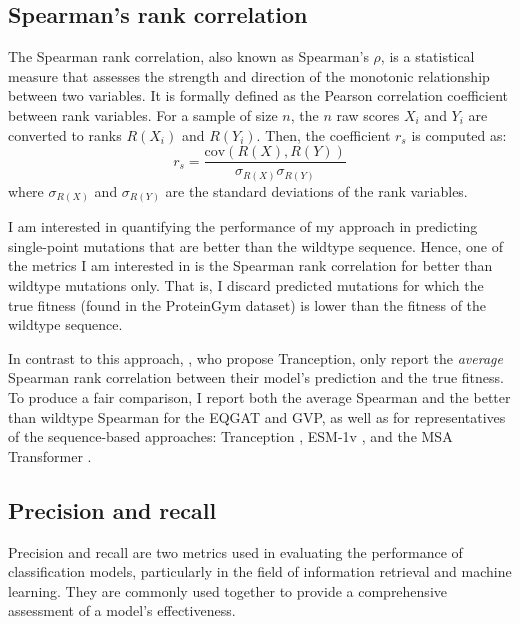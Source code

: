 \subsection{Spearman's rank correlation} 
The Spearman rank correlation, also known as Spearman's $\rho$, is a statistical measure that assesses the strength and direction of the monotonic relationship between two variables. It is formally defined as the Pearson correlation coefficient between rank variables. For a sample of size $n$, the $n$ raw scores $X_i$ and $Y_i$ are converted to ranks $R(X_i)$ and $R(Y_i)$. Then, the coefficient $r_s$ is computed as:
\begin{equation}
    r_s = \frac{\text{cov}(R(X), R(Y))}{\sigma_{R(X)}\sigma_{R(Y)}}
\end{equation}
where $\sigma_{R(X)}$ and $\sigma_{R(Y)}$ are the standard deviations of the rank variables. 

I am interested in quantifying the performance of my approach in predicting single-point mutations that are better than the wildtype sequence. Hence, one of the metrics I am interested in is the Spearman rank correlation for better than wildtype mutations only. That is, I discard predicted mutations for which the true fitness (found in the ProteinGym dataset) is lower than the fitness of the wildtype sequence.

In contrast to this approach, \citet{tranception}, who propose Tranception, only report the \textit{average} Spearman rank correlation between their model's prediction and the true fitness. To produce a fair comparison, I report both the average Spearman and the better than wildtype Spearman for the EQGAT and GVP, as well as for representatives of the sequence-based approaches: Tranception \cite{tranception}, ESM-1v \cite{meier2021language}, and the MSA Transformer \cite{Rao2020}.

\subsection{Precision and recall} 

Precision and recall are two metrics used in evaluating the performance of classification models, particularly in the field of information retrieval and machine learning. They are commonly used together to provide a comprehensive assessment of a model's effectiveness.

